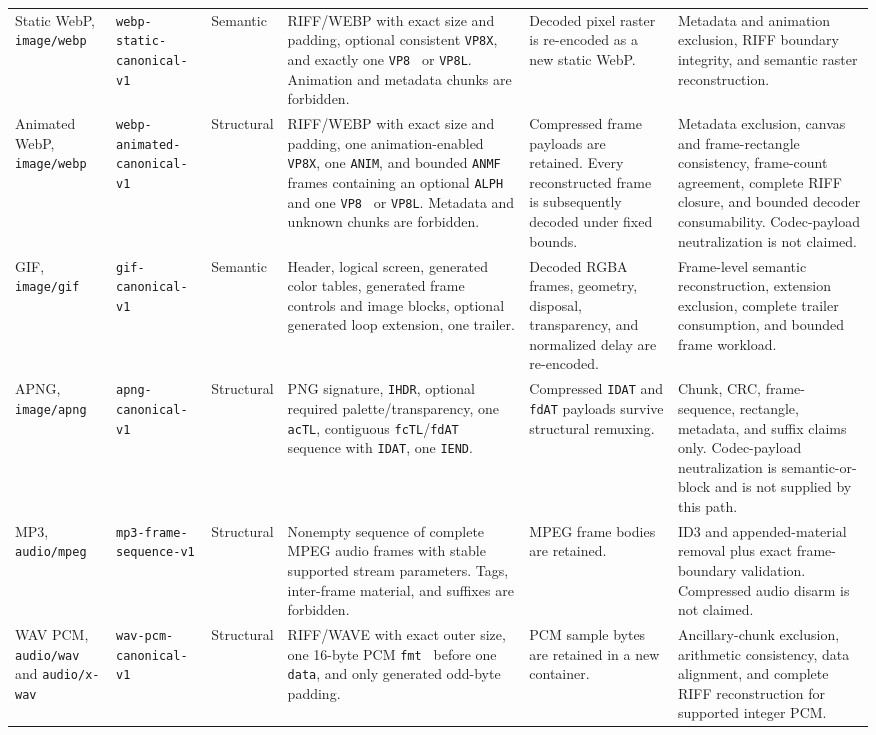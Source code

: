 \begin{landscape}
\begin{longtable}{L{1.8cm}L{2.4cm}L{2.0cm}L{3.6cm}L{3.6cm}L{4.0cm}}
Static WebP, \texttt{image/webp} & \nolinkurl{webp-static-canonical-v1} & Semantic & RIFF/WEBP with exact size and padding, optional consistent \texttt{VP8X}, and exactly one \texttt{VP8 } or \texttt{VP8L}.  Animation and metadata chunks are forbidden. & Decoded pixel raster is re-encoded as a new static WebP. & Metadata and animation exclusion, RIFF boundary integrity, and semantic raster reconstruction. \\
Animated WebP, \texttt{image/webp} & \nolinkurl{webp-animated-canonical-v1} & Structural & RIFF/WEBP with exact size and padding, one animation-enabled \texttt{VP8X}, one \texttt{ANIM}, and bounded \texttt{ANMF} frames containing an optional \texttt{ALPH} and one \texttt{VP8 } or \texttt{VP8L}. Metadata and unknown chunks are forbidden. & Compressed frame payloads are retained. Every reconstructed frame is subsequently decoded under fixed bounds. & Metadata exclusion, canvas and frame-rectangle consistency, frame-count agreement, complete RIFF closure, and bounded decoder consumability. Codec-payload neutralization is not claimed. \\
GIF, \texttt{image/gif} & \nolinkurl{gif-canonical-v1} & Semantic & Header, logical screen, generated color tables, generated frame controls and image blocks, optional generated loop extension, one trailer. & Decoded RGBA frames, geometry, disposal, transparency, and normalized delay are re-encoded. & Frame-level semantic reconstruction, extension exclusion, complete trailer consumption, and bounded frame workload. \\
APNG, \texttt{image/apng} & \nolinkurl{apng-canonical-v1} & Structural & PNG signature, \texttt{IHDR}, optional required palette/transparency, one \texttt{acTL}, contiguous \texttt{fcTL}/\texttt{fdAT} sequence with \texttt{IDAT}, one \texttt{IEND}. & Compressed \texttt{IDAT} and \texttt{fdAT} payloads survive structural remuxing. & Chunk, CRC, frame-sequence, rectangle, metadata, and suffix claims only.  Codec-payload neutralization is semantic-or-block and is not supplied by this path. \\
MP3, \texttt{audio/mpeg} & \nolinkurl{mp3-frame-sequence-v1} & Structural & Nonempty sequence of complete MPEG audio frames with stable supported stream parameters.  Tags, inter-frame material, and suffixes are forbidden. & MPEG frame bodies are retained. & ID3 and appended-material removal plus exact frame-boundary validation.  Compressed audio disarm is not claimed. \\
WAV PCM, \texttt{audio/wav} and \texttt{audio/x-wav} & \nolinkurl{wav-pcm-canonical-v1} & Structural & RIFF/WAVE with exact outer size, one 16-byte PCM \texttt{fmt } before one \texttt{data}, and only generated odd-byte padding. & PCM sample bytes are retained in a new container. & Ancillary-chunk exclusion, arithmetic consistency, data alignment, and complete RIFF reconstruction for supported integer PCM. \\

\end{longtable}
\end{landscape}
